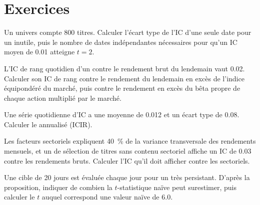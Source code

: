 \section{Exercices}

\begin{exercise}[$\star$]\label{exo:rs:anatomy-of-a-predictor:1}
Un univers compte 800 titres. Calculer l'écart type de l'IC d'une seule date pour un  inutile, puis le nombre de dates indépendantes
nécessaires pour qu'un IC moyen de 0.01 atteigne $t = 2$.
\end{exercise}

\begin{exercise}[$\star$]\label{exo:rs:anatomy-of-a-predictor:2}
L'IC de rang quotidien d'un  contre le rendement brut du lendemain vaut 0.02. Calculer son IC de rang contre le rendement
du lendemain en excès de l'indice équipondéré du marché, puis contre le rendement en excès du bêta propre de chaque action multiplié par le marché.
\end{exercise}

\begin{exercise}[$\star$]\label{exo:rs:anatomy-of-a-predictor:3}
Une série quotidienne d'IC a une moyenne de 0.012 et un écart type de 0.08. Calculer le  annualisé (ICIR).
\end{exercise}

\begin{exercise}[$\star\star$]\label{exo:rs:anatomy-of-a-predictor:4}
Les facteurs sectoriels expliquent 40~\% de la variance transversale des rendements mensuels, et un  de sélection de titres sans
contenu sectoriel affiche un IC de 0.03 contre les rendements bruts. Calculer l'IC qu'il doit afficher contre les  sectoriels.
\end{exercise}

\begin{exercise}[$\star\star$]\label{exo:rs:anatomy-of-a-predictor:5}
Une cible de 20 jours est évaluée chaque jour pour un  très persistant. D'après la proposition, indiquer de combien la $t$-statistique naïve
peut surestimer, puis calculer le $t$ auquel correspond une valeur naïve de 6.0.
\end{exercise}

